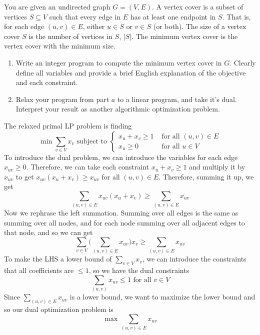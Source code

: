   \begin{example}
    \label{ex:vertex-cover}
    You are given an undirected graph $G = (V, E)$. A vertex cover is a subset of vertices $S \subseteq V$ such that every edge in $E$ has at least one endpoint in $S$. That is, for each edge $(u, v) \in E$, either $u \in S$ or $v \in S$ (or both). The size of a vertex cover $S$ is the number of vertices in $S$, $|S|$. The minimum vertex cover is the vertex cover with the minimum size.
    \begin{enumerate}
      \item Write an integer program to compute the minimum vertex cover in $G$.  Clearly define all variables and provide a brief English explanation of the objective and each constraint.
      \item Relax your program from part $a$ to a linear program, and take it's dual. Interpret your result as another algorithmic optimization problem.
    \end{enumerate} 

    The relaxed primal LP problem is finding 
    \begin{equation}
      \min \sum_{v \in V} x_v \text{ subject to } \begin{cases} 
        x_u + x_v \geq 1 & \text{ for all } (u, v) \in E \\
        x_u \geq 0 & \text{ for all } u \in V
      \end{cases}
    \end{equation}
    To introduce the dual problem, we can introduce the variables for each edge $x_{uv} \geq 0$. Therefore, we can take each constraint $x_u + x_v \geq 1$ and multiply it by $x_{uv}$ to get $x_{uv} (x_u + x_v) \geq x_{uv}$ for all $(u, v) \in E$. Therefore, summing it up, we get 
    \begin{equation}
      \sum_{(u, v) \in E} x_{uv} (x_u + x_v) \geq \sum_{(u, v) \in E} x_{uv}
    \end{equation}
    Now we rephrase the left summation. Summing over all edges is the same as summing over all nodes, and for each node summing over all adjacent edges to that node, and so we can get 
    \begin{equation}
      \sum_{v \in V} \bigg( \sum_{(u, v) \in E} x_{uv} \bigg) x_v \geq \sum_{(u, v) \in E} x_{uv} 
    \end{equation}
    To make the LHS a lower bound of $\sum_{v \in V} x_v$, we can introduce the constraints that all coefficients are $\leq 1$, so we have the dual constraints 
    \begin{equation}
      \sum_{(u, v)} x_{uv} \leq 1 \text{ for all } v \in V
    \end{equation}
    Since $\sum_{(u, v) \in E} x_{uv}$ is a lower bound, we want to maximize the lower bound and so our dual optimization problem is 
    \begin{equation}
      \max \sum_{(u, v) \in E} x_{uv}
    \end{equation}
  \end{example}
